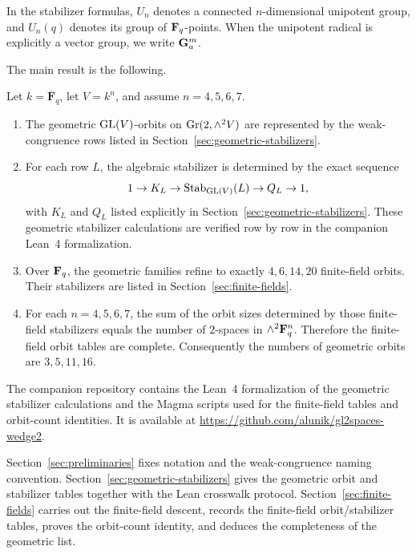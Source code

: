 In the stabilizer formulas, \(U_n\) denotes a connected \(n\)-dimensional
unipotent group, and \(U_n(q)\) denotes its group of \(\mathbf F_q\)-points. When the
unipotent radical is explicitly a vector group, we write \(\mathbf G_a^m\).

The main result is the following.

\begin{theorem}
\label{thm:intro-main}
Let \(k=\overline{\mathbf F}_q\), let \(V=k^n\), and assume \(n=4,5,6,7\).

\begin{enumerate}[label=\arabic*.]
\item The geometric \(\mathrm{GL}(V)\)-orbits on \(\mathrm{Gr}(2,\wedge^2 V)\) are represented
  by the weak-congruence rows listed in
  Section~\ref{sec:geometric-stabilizers}.
\item For each row \(L\), the algebraic stabilizer is determined by the exact
  sequence
  \[
    1\to K_L\to \mathrm{Stab}_{\mathrm{GL}(V)}(L)\to Q_L\to 1,
  \]
  with \(K_L\) and \(Q_L\) listed explicitly in
  Section~\ref{sec:geometric-stabilizers}. These geometric stabilizer
  calculations are verified row by row in the companion Lean~4 formalization.
\item Over \(\mathbf F_q\), the geometric families refine to exactly \(4,6,14,20\)
  finite-field orbits. Their stabilizers are listed in
  Section~\ref{sec:finite-fields}.
\item For each \(n=4,5,6,7\), the sum of the orbit sizes determined by those
  finite-field stabilizers equals the number of \(2\)-spaces in
  \(\wedge^2 \mathbf F_q^n\). Therefore the finite-field orbit tables are complete.
  Consequently the numbers of geometric orbits are \(3,5,11,16\).
\end{enumerate}
\end{theorem}

The companion repository contains the Lean~4 formalization of the geometric
stabilizer calculations and the Magma scripts used for the finite-field tables
and orbit-count identities. It is available at
\url{https://github.com/alunik/gl2spaces-wedge2}.

Section~\ref{sec:preliminaries} fixes notation and the weak-congruence naming
convention. Section~\ref{sec:geometric-stabilizers} gives the geometric orbit
and stabilizer tables together with the Lean crosswalk protocol.
Section~\ref{sec:finite-fields} carries out the finite-field descent, records
the finite-field orbit/stabilizer tables, proves the orbit-count identity, and
deduces the completeness of the geometric list.
